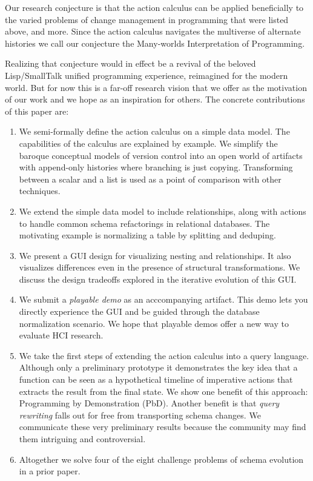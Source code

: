 \documentclass[english,submission]{programming}
\theoremstyle{definition}
\begin{document}
Our research conjecture is that the action calculus can be applied beneficially to the varied problems of change management in programming that were listed above, and more. Since the action calculus navigates the multiverse of alternate histories we call our conjecture the Many-worlds Interpretation of Programming.

Realizing that conjecture would in effect be a revival of the beloved Lisp/SmallTalk unified programming experience, reimagined for the modern world. But for now this is a far-off research vision that we offer
as the motivation of our work and we hope as an inspiration for others. The concrete contributions of this paper are:

\begin{enumerate}

  \item We semi-formally define the action calculus on a simple data model. The capabilities of the calculus are explained by example. We simplify the baroque conceptual models of version control into an open world of artifacts with append-only histories where branching is just copying. Transforming between a scalar and a list is used as a point of comparison with other techniques.

  \item We extend the simple data model to include relationships, along with actions to handle common schema refactorings in relational databases. The motivating example is normalizing a table by splitting and deduping.

  \item We present a GUI design for visualizing nesting and relationships. It also visualizes differences even in the presence of structural transformations. We discuss the design tradeoffs explored in the iterative evolution of this GUI.

  \item We submit a \textit{playable demo} as an acccompanying artifact. This demo lets you directly experience the GUI and be guided through the database normalization scenario. We hope that playable demos offer a new way to evaluate HCI research.

  \item We take the first steps of extending the action calculus into a query language. Although only a preliminary prototype it demonstrates the key idea that a function can be seen as a hypothetical timeline of imperative actions that extracts the result from the final state. We show one benefit of this approach: Programming by Demonstration (PbD). Another benefit is that \textit{query rewriting} falls out for free from transporting schema changes. We communicate these very preliminary results because the community may find them intriguing and controversial.

  \item Altogether we solve four of the eight challenge problems of schema evolution in a prior paper\cite{challenge-problems}.

\end{enumerate}
\end{document}
